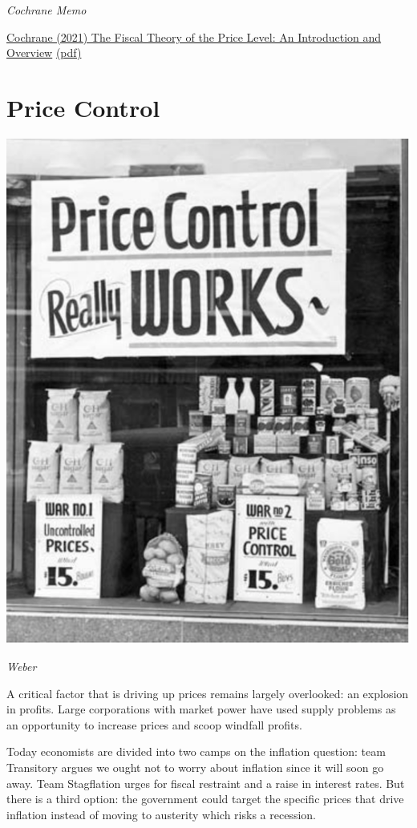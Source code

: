 \documentclass[
]{book}
\begin{document}
\emph{Cochrane Memo}

\href{https://www.johnhcochrane.com/research-all/the-fiscal-theory-of-the-price-level-1}{Cochrane (2021) The Fiscal Theory of the Price Level: An Introduction and Overview}
\href{pdf/Cochrane_2021_Fiscal_Theory_of_Price_Level.pdf}{(pdf)}

\hypertarget{price-control}{%
\section{Price Control}\label{price-control}}

\includegraphics{fig/price_control_window.png}

\emph{Weber}

A critical factor that is driving up prices remains largely overlooked:
an explosion in profits.
Large corporations with market power have used supply problems as an opportunity to increase prices and scoop windfall profits.

Today economists are divided into two camps on the inflation question: team Transitory argues we ought not to worry about inflation since it will soon go away. Team Stagflation urges for fiscal restraint and a raise in interest rates. But there is a third option: the government could target the specific prices that drive inflation instead of moving to austerity which risks a recession.
\end{document}
